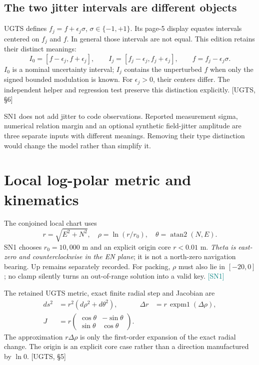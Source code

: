 \documentclass[11pt,a4paper]{article}
\newcommand{\uRef}[1]{\textcolor{muted}{[UGTS, #1]}}
\newcommand{\newprofile}{\textcolor{teal}{[SN1]}}
\begin{document}
\subsection{The two jitter intervals are different objects}
UGTS defines $f_j=f+\epsilon_j\sigma$, $\sigma\in\{-1,+1\}$. Its page-5 display equates intervals centered
on $f_j$ and $f$. In general those intervals are not equal. This edition retains their distinct meanings:
\begin{equation}
I_0=[f-\epsilon_j,f+\epsilon_j],\qquad
I_j=[f_j-\epsilon_j,f_j+\epsilon_j],\qquad f=f_j-\epsilon_j\sigma.
\end{equation}
$I_0$ is a nominal uncertainty interval; $I_j$ contains the unperturbed $f$ when only the signed bounded
modulation is known. For $\epsilon_j>0$, their centers differ. The independent helper and regression test
preserve this distinction explicitly. \uRef{\S6}

SN1 does not add jitter to code observations. Reported measurement sigma, numerical relation margin and
an optional synthetic field-jitter amplitude are three separate inputs with different meanings. Removing their
type distinction would change the model rather than simplify it.
\clearpage

\section{Local log-polar metric and kinematics}
The conjoined local chart uses
\begin{equation}
r=\sqrt{E^2+N^2},\quad \rho=\ln(r/r_0),\quad\theta=\operatorname{atan2}(N,E).
\end{equation}
SN1 chooses $r_0=10{,}000$ m and an explicit origin core $r<0.01$ m. \emph{Theta is east-zero and
counterclockwise in the EN plane}; it is not a north-zero navigation bearing. Up remains separately recorded.
For packing, $\rho$ must also lie in $[-20,0]$; no clamp silently turns an out-of-range solution into a valid key.
\newprofile

The retained UGTS metric, exact finite radial step and Jacobian are
\begin{align}
ds^2&=r^2(d\rho^2+d\theta^2),& \Delta r&=r\,\operatorname{expm1}(\Delta\rho),\\
J&=r\begin{pmatrix}\cos\theta&-\sin\theta\\\sin\theta&\cos\theta\end{pmatrix}.&&
\end{align}
The approximation $r\Delta\rho$ is only the first-order expansion of the exact radial change.
The origin is an explicit core case rather than a direction manufactured by $\ln0$. \uRef{\S5}
\end{document}
